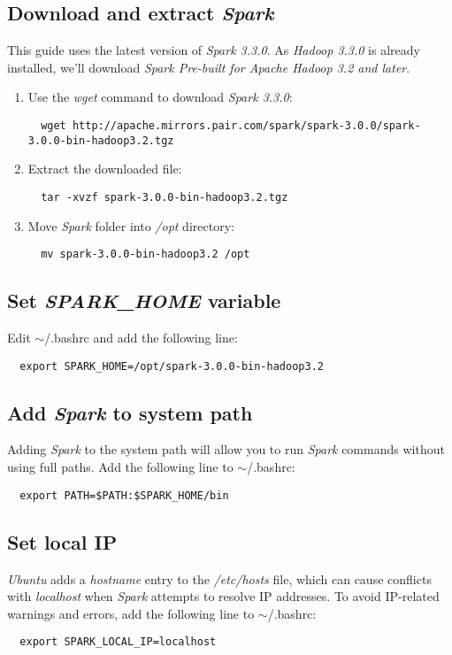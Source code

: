 \documentclass{article}
\begin{document}
  \subsection{Download and extract \emph{Spark}}
  This guide uses the latest version of \emph{Spark 3.3.0}. As \emph{Hadoop 3.3.0} is
  already installed, we'll download \emph{Spark Pre-built for Apache Hadoop 3.2 and later}.
  \begin{enumerate}
  \item Use the \emph{wget} command to download \emph{Spark 3.3.0}:
  \begin{verbatim}
  wget http://apache.mirrors.pair.com/spark/spark-3.0.0/spark-3.0.0-bin-hadoop3.2.tgz
  \end{verbatim}

  \item Extract the downloaded file:
  \begin{verbatim}
  tar -xvzf spark-3.0.0-bin-hadoop3.2.tgz
  \end{verbatim}

  \item Move \emph{Spark} folder into \emph{/opt} directory:
  \begin{verbatim}
  mv spark-3.0.0-bin-hadoop3.2 /opt
  \end{verbatim}
  \end{enumerate}

  \subsection{Set \emph{SPARK\_HOME} variable}
  Edit $\sim$/.bashrc and add the following line:
  \begin{verbatim}
  export SPARK_HOME=/opt/spark-3.0.0-bin-hadoop3.2
  \end{verbatim}
  
  \subsection{Add \emph{Spark} to system path}
  Adding \emph{Spark} to the system path will allow you to run \emph{Spark} commands without
  using full paths. Add the following line to $\sim$/.bashrc:
  \begin{verbatim}
  export PATH=$PATH:$SPARK_HOME/bin
  \end{verbatim}
  
  \subsection{Set local IP}
  \emph{Ubuntu} adds a \emph{hostname} entry to the \emph{/etc/hosts} file, which can cause
  conflicts with \emph{localhost} when \emph{Spark} attempts to resolve IP addresses. To avoid
  IP-related warnings and errors, add the following line to $\sim$/.bashrc:
  \begin{verbatim}
  export SPARK_LOCAL_IP=localhost
  \end{verbatim}
\end{document}
